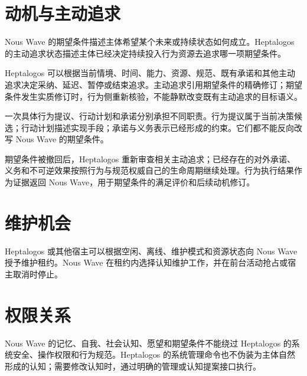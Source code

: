 \section{动机与主动追求}

Nous Wave 的期望条件描述主体希望某个未来或持续状态如何成立。Heptalogos 的主动追求状态描述主体已经决定持续投入行为资源去追求哪一项期望条件。

Heptalogos 可以根据当前情境、时间、能力、资源、规范、既有承诺和其他主动追求决定采纳、延迟、暂停或结束追求。主动追求引用期望条件的精确修订；期望条件发生实质修订时，行为侧重新核验，不能静默改变既有主动追求的目标语义。

一次具体行为提议、行动计划和承诺分别承担不同职责。行为提议属于当前决策候选；行动计划描述实现手段；承诺与义务表示已经形成的约束。它们都不能反向改写 Nous Wave 的期望条件。

期望条件被撤回后，Heptalogos 重新审查相关主动追求；已经存在的对外承诺、义务和不可逆效果按照行为与规范权威自己的生命周期继续处理。行为执行结果作为证据返回 Nous Wave，用于期望条件的满足评价和后续动机修订。

\section{维护机会}

Heptalogos 或其他宿主可以根据空闲、离线、维护模式和资源状态向 Nous Wave 授予维护租约。Nous Wave 在租约内选择认知维护工作，并在前台活动抢占或宿主取消时停止。

\section{权限关系}

Nous Wave 的记忆、自我、社会认知、愿望和期望条件不能绕过 Heptalogos 的系统安全、操作权限和行为规范。Heptalogos 的系统管理命令也不伪装为主体自然形成的认知；需要修改认知时，通过明确的管理或认知提案接口执行。
